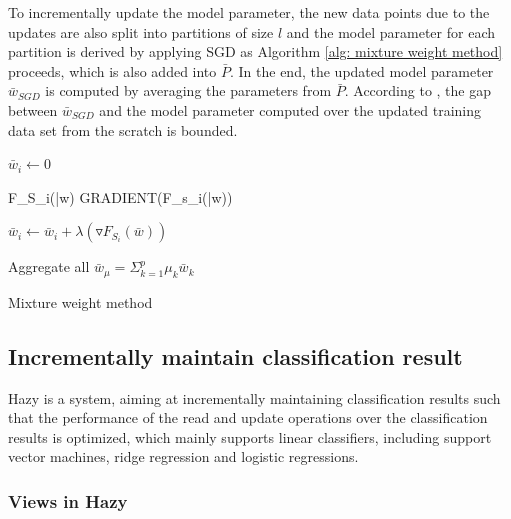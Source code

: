 To incrementally update the model parameter, the new data points due to the updates are also split into partitions of size $l$ and the model parameter for each partition is derived by applying SGD as Algorithm \ref{alg: mixture weight method} proceeds, which is also added into $\bar{P}$. In the end, the updated model parameter $\bar{w}_{SGD}$ is computed by averaging the parameters from $\bar{P}$. According to \cite{mcdonald2009efficient}, the gap between $\bar{w}_{SGD}$ and the model parameter computed over the updated training data set from the scratch is bounded.


\begin{algorithm}[h!] 
\footnotesize

 
 {
    $\bar{w}_i \leftarrow 0$
    
    {
        \Delta F_{S_i}(\bar{w}) \leftarrow GRADIENT(F_{s_i}(\bar{w}))
    
        $\bar{w}_i \leftarrow \bar{w}_i + \lambda(\triangledown F_{S_i}(\bar{w}))$
    }
    
    Aggregate all $\bar{w}_{\mu} = \Sigma_{k=1}^p\mu_k\bar{w}_k$    
 }
 
 \caption{Mixture weight method}
 \label{alg: mixture weight method}
 \end{algorithm}




\subsection{Incrementally maintain classification result}
Hazy \cite{koc2011incrementally} is a system, aiming at incrementally maintaining classification results such that the performance of the read and update operations over the classification results is optimized, which mainly supports linear classifiers, including support vector machines, ridge regression and logistic regressions.

\subsubsection{Views in Hazy}




